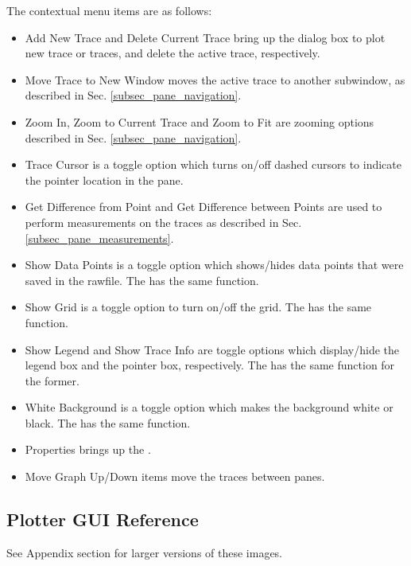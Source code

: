 The contextual menu items are as follows:
\begin{itemize}
\item \textsf{Add New Trace} and \textsf{Delete Current Trace} bring up the dialog box to plot new trace or traces, and delete the active trace, respectively.
\item \textsf{Move Trace to New Window} moves the active trace to another subwindow, as described in Sec. \ref{subsec_pane_navigation}.
\item \textsf{Zoom In, Zoom to Current Trace} and \textsf{Zoom to Fit} are zooming options described in Sec. \ref{subsec_pane_navigation}.
\item \textsf{Trace Cursor} is a toggle option which turns on/off dashed cursors to indicate the pointer location in the pane.
\item \textsf{Get Difference from Point} and \textsf{Get Difference between Points} are used to perform measurements on the traces as described in Sec. \ref{subsec_pane_measurements}.
\item \textsf{Show Data Points} is a toggle option which shows/hides data points that were saved in the rawfile. The  has the same function. 
\item \textsf{Show Grid} is a toggle option to turn on/off the grid. The  has the same function.
\item \textsf{Show Legend} and \textsf{Show Trace Info} are toggle options which display/hide the legend box and the pointer box, respectively.  The  has the same function for the former.
\item \textsf{White Background} is a toggle option which makes the background white or black.  The  has the same function.
\item \textsf{Properties} brings up the .
\item \textsf{Move Graph Up/Down} items move the traces between panes.
\end{itemize}



\subsection{Plotter GUI Reference}
\label{subsec_pane_plotterguireference}

See Appendix section for larger versions of these images.

